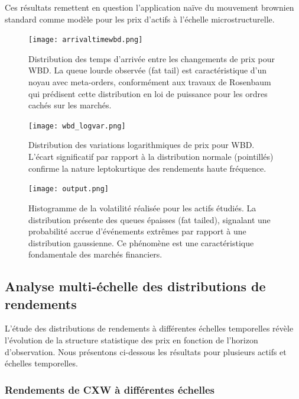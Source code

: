 \documentclass[12pt,a4paper]{article}
\theoremstyle{definition}
\theoremstyle{remark}
\begin{document}
Ces résultats remettent en question l'application naïve du mouvement brownien standard comme modèle pour les prix d'actifs à l'échelle microstructurelle.

\begin{figure}[h!]
    \centering
    \texttt{[image: arrivaltimewbd.png]}
    \caption{Distribution des temps d'arrivée entre les changements de prix pour WBD. La queue lourde observée (fat tail) est caractéristique d'un noyau avec meta-orders, conformément aux travaux de Rosenbaum qui prédisent cette distribution en loi de puissance pour les ordres cachés sur les marchés.}
    \label{fig:arrival_times_wbd}
\end{figure}

\begin{figure}[h!]
    \centering
    \texttt{[image: wbd\_logvar.png]}
    \caption{Distribution des variations logarithmiques de prix pour WBD. L'écart significatif par rapport à la distribution normale (pointillés) confirme la nature leptokurtique des rendements haute fréquence.}
    \label{fig:log_variations_wbd}
\end{figure}

\begin{figure}[h!]
    \centering
    \texttt{[image: output.png]}
    \caption{Histogramme de la volatilité réalisée pour les actifs étudiés. La distribution présente des queues épaisses (fat tailed), signalant une probabilité accrue d'événements extrêmes par rapport à une distribution gaussienne. Ce phénomène est une caractéristique fondamentale des marchés financiers.}
    \label{fig:volatility_hist}
\end{figure}

\subsection{Analyse multi-échelle des distributions de rendements}

L'étude des distributions de rendements à différentes échelles temporelles révèle l'évolution de la structure statistique des prix en fonction de l'horizon d'observation. Nous présentons ci-dessous les résultats pour plusieurs actifs et échelles temporelles.

\subsubsection{Rendements de CXW à différentes échelles}
\end{document}
